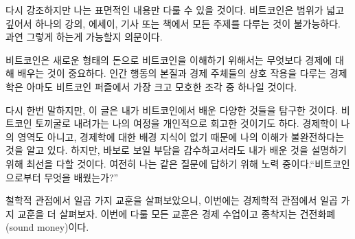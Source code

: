다시 강조하지만 나는 표면적인 내용만 다룰 수 있을 것이다.  
비트코인은 범위가 넓고 깊어서 하나의 강의, 에세이, 기사 또는 책에서 모든 주제를 다루는 것이 불가능하다.
과연 그렇게 하는게 가능할지 의문이다.  


비트코인은 새로운 형태의 돈으로 비트코인을 이해하기 위해서는 무엇보다 경제에 대해 배우는 것이 중요하다.
인간 행동의 본질과 경제 주체들의 상호 작용을 다루는 경제학은 아마도 비트코인 퍼즐에서 가장 크고 모호한 조각 중 하나일 것이다.

다시 한번 말하지만, 이 글은 내가 비트코인에서 배운 다양한 것들을 탐구한 것이다. 
비트코인 토끼굴로 내려가는 나의 여정을 개인적으로 회고한 것이기도 하다.  
경제학이 나의 영역도 아니고, 경제학에 대한 배경 지식이 없기 때문에 나의 이해가 불완전하다는 것을 알고 있다. 
하지만, 바보로 보일 부담을 감수하고서라도 내가 배운 것을 설명하기 위해 최선을 다할 것이다.
여전히 나는 같은 질문에 답하기 위해 노력 중이다.\enquote{비트코인으로부터 무엇을 배웠는가?}

철학적 관점에서 일곱 가지 교훈을 살펴보았으니, 이번에는 경제학적 관점에서 일곱 가지 교훈을 더 살펴보자.
이번에 다룰 모든 교훈은 경제 수업이고 종착지는 건전화폐(sound money)이다.


